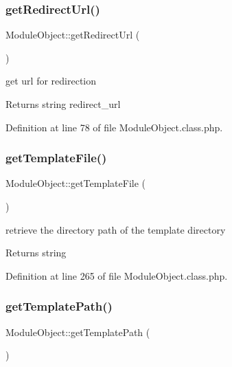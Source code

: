 \hypertarget{classModuleObject_ae7c0b4d36f7ef9e8b3ec59a6a9bf6116}{}\label{classModuleObject_ae7c0b4d36f7ef9e8b3ec59a6a9bf6116} 
\subsubsection{\texorpdfstring{get\+Redirect\+Url()}{getRedirectUrl()}}
{\footnotesize\ttfamily Module\+Object\+::get\+Redirect\+Url (\begin{DoxyParamCaption}{ }\end{DoxyParamCaption})}

get url for redirection \begin{DoxyReturn}{Returns}
string redirect\+\_\+url 
\end{DoxyReturn}


Definition at line 78 of file Module\+Object.\+class.\+php.

\hypertarget{classModuleObject_af5456f80bf7bd5d3c20dd6547423a419}{}\label{classModuleObject_af5456f80bf7bd5d3c20dd6547423a419} 
\subsubsection{\texorpdfstring{get\+Template\+File()}{getTemplateFile()}}
{\footnotesize\ttfamily Module\+Object\+::get\+Template\+File (\begin{DoxyParamCaption}{ }\end{DoxyParamCaption})}

retrieve the directory path of the template directory \begin{DoxyReturn}{Returns}
string 
\end{DoxyReturn}


Definition at line 265 of file Module\+Object.\+class.\+php.

\hypertarget{classModuleObject_a10f29d4a49d7e24bdab4e348633c6609}{}\label{classModuleObject_a10f29d4a49d7e24bdab4e348633c6609} 
\subsubsection{\texorpdfstring{get\+Template\+Path()}{getTemplatePath()}}
{\footnotesize\ttfamily Module\+Object\+::get\+Template\+Path (\begin{DoxyParamCaption}{ }\end{DoxyParamCaption})}

